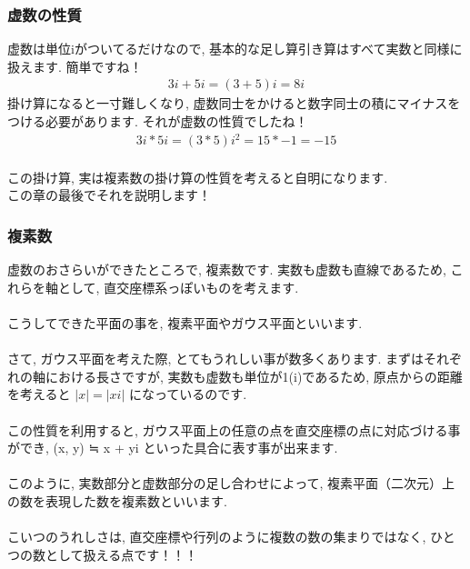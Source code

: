 \documentclass[11pt,a4paper]{jsarticle}
\begin{document}
\subsubsection{虚数の性質}
虚数は単位iがついてるだけなので, 基本的な足し算引き算はすべて実数と同様に扱えます. 簡単ですね！\\
\begin{eqnarray}
3i + 5i  =(3 + 5)i = 8i
\end{eqnarray}
掛け算になると一寸難しくなり, 虚数同士をかけると数字同士の積にマイナスをつける必要があります. それが虚数の性質でしたね！\\
\begin{eqnarray}
3i * 5i = (3*5)i^2 = 15 * -1 = -15
\end{eqnarray}
\\
この掛け算, 実は複素数の掛け算の性質を考えると自明になります.\\
この章の最後でそれを説明します！\\
\subsubsection{複素数}
虚数のおさらいができたところで, 複素数です. 実数も虚数も直線であるため, これらを軸として, 直交座標系っぽいものを考えます.\\
\\
こうしてできた平面の事を, 複素平面やガウス平面といいます.\\
\\
さて, ガウス平面を考えた際, とてもうれしい事が数多くあります. まずはそれぞれの軸における長さですが, 実数も虚数も単位が1(i)であるため, 原点からの距離を考えると $ |x| = |xi| $ になっているのです. \\
\\
この性質を利用すると, ガウス平面上の任意の点を直交座標の点に対応づける事ができ, (x, y) ≒ x + yi といった具合に表す事が出来ます. \\
\\
このように, 実数部分と虚数部分の足し合わせによって, 複素平面（二次元）上の数を表現した数を複素数といいます.\\
\\
こいつのうれしさは, 直交座標や行列のように複数の数の集まりではなく, ひとつの数として扱える点です！！！\\
\end{document}

